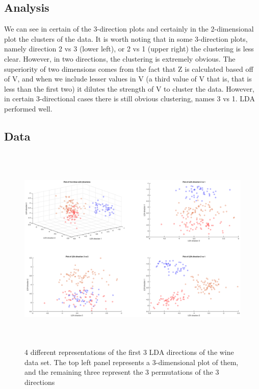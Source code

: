 \documentclass{article}
\begin{document}
\subsection*{Analysis}
    We can see in certain of the 3-direction plots and certainly in the 2-dimensional plot the clusters of the data.  It is worth noting that in some 3-direction plots, namely direction 2 vs 3 (lower left), or 2 vs 1 (upper right) the clustering is less clear.  However, in two directions, the clustering is extremely obvious.  The superiority of two dimensions comes from the fact that Z is calculated based off of V, and when we include lesser values in V (a third value of V that is, that is less than the first two) it dilutes the strength of V to cluster the data.  However, in certain 3-directional cases there is still obvious clustering, names 3 vs 1.   LDA performed well.

\subsection*{Data}

\begin{figure}[h!]
    \centerline
    {
    \includegraphics[width=20cm, height=10cm]{Q1_3LDA_Directions}
    }
    \caption{\label{fig:my figure} 4 different representations of the first 3 LDA directions of the wine data set.  The top left panel represents a 3-dimensional plot of them, and the remaining three represent the 3 permutations of the 3 directions}
\end{figure}
\end{document}
